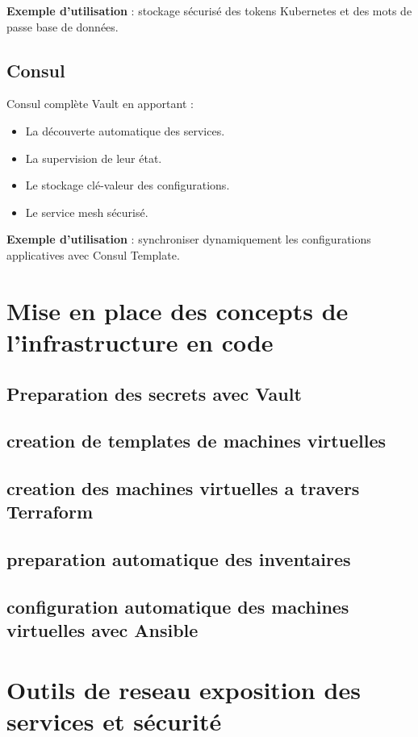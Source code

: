\textbf{Exemple d’utilisation} : stockage sécurisé des tokens Kubernetes et des mots de passe base de données.

\subsection{Consul}

Consul complète Vault en apportant :
\begin{itemize}
	\item La découverte automatique des services.
	\item La supervision de leur état.
	\item Le stockage clé-valeur des configurations.
	\item Le service mesh sécurisé.
\end{itemize}

\textbf{Exemple d’utilisation} : synchroniser dynamiquement les configurations applicatives avec Consul Template.

\section{Mise en place des concepts de l'infrastructure en code}
\subsection{Preparation des secrets avec Vault}
\subsection{creation de templates de machines virtuelles}
\subsection{creation des machines virtuelles a travers Terraform}
\subsection{preparation automatique des inventaires}
\subsection{configuration automatique des machines virtuelles avec Ansible}
\section{Outils de reseau exposition des services et sécurité}

